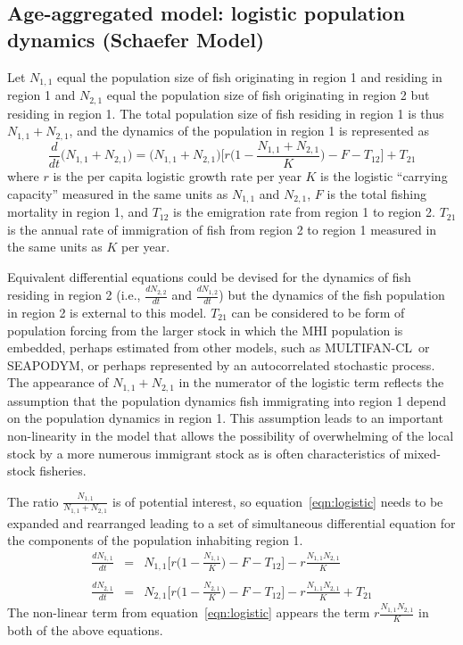 \documentclass[12pt,letterpaper]{article}
\newcommand\SD{SEAPODYM}
\newcommand\MFCL{MULTIFAN-CL}
\newcommand\None{{N_{1,1}}}
\newcommand\Ntwo{{N_{2,1}}}
\newcommand\Nsum{{N_{1,1}+N_{2,1}}}
\begin{document}
\subsection*{Age-aggregated model: logistic population dynamics (Schaefer Model)}

Let $\None$ equal the population size of fish originating in region 1
and residing in region 1
and $\Ntwo$ equal the population size of fish originating in region 2
but residing in region 1.
The total population size of fish residing in region 1 is thus
$\Nsum$, and the dynamics of the population in region 1 is represented as
\begin{equation}
\frac{d}{dt}\big(\Nsum\big)=\big(\Nsum\big)\Big[r\Big(1-\frac{\Nsum}{K}\Big)-F-T_{12}\Big]+T_{21}
\label{eqn:logistic}
\end{equation}
where $r$ is the per capita logistic growth rate per year $K$ is the
logistic ``carrying capacity'' measured in the same units as $\None$
and $\Ntwo$, $F$ is the total fishing mortality in region 1, and $T_{12}$
is the emigration rate from region 1 to region 2. $T_{21}$
is the annual rate of immigration of fish from region 2 to region 1
measured in the same units as $K$ per year.

Equivalent differential equations could be devised for the dynamics of
fish residing in region 2 (i.e., $\frac{dN_{2,2}}{dt}$ and
$\frac{dN_{1,2}}{dt}$) but 
the dynamics of the fish population in region 2 is external to this
model. $T_{21}$ can be considered to be form of population forcing
from the larger stock in which the MHI population is embedded, perhaps
estimated from other models, such as \MFCL\ or \SD, or perhaps
represented by an
autocorrelated stochastic process. The appearance of
$\Nsum$ in the numerator of the logistic term reflects the assumption
that the population dynamics fish immigrating into region 1 depend on
the population dynamics in region 1. This assumption leads to an
important non-linearity in the model that allows the possibility of
overwhelming of the
local stock by a more numerous immigrant stock as is often characteristics of
mixed-stock fisheries.

The ratio $\frac{\None}{\Nsum}$ is of potential interest, so
equation~\ref{eqn:logistic} needs to be expanded and rearranged
leading to a set of simultaneous differential equation for the
components of the population inhabiting region 1.
\begin{eqnarray}
\frac{d\None}{dt}&=&\None\Big[r\Big(1-\frac{\None}{K}\Big)
-F - T_{12}\Big] - r\frac{\None\Ntwo}{K}\nonumber\\
\\
\frac{d\Ntwo}{dt}&=&\Ntwo\Big[r\Big(1-\frac{\Ntwo}{K}\Big)
-F - T_{12}\Big] - r\frac{\None\Ntwo}{K} + T_{21}\nonumber
\label{eqn:coupledschaefer}
\end{eqnarray}
The non-linear term from equation~\ref{eqn:logistic} appears the term
$r\frac{\None\Ntwo}{K}$ in both of the above equations.
\end{document}
